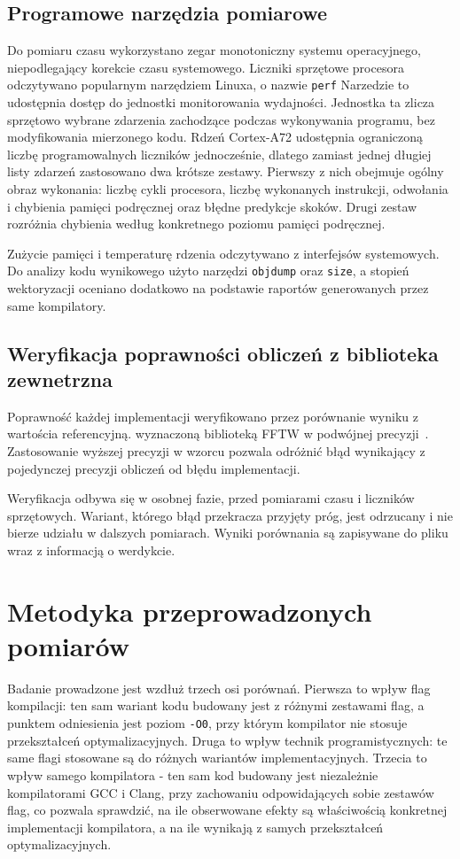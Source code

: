 \subsection{Programowe narzędzia pomiarowe}

Do pomiaru czasu wykorzystano zegar monotoniczny systemu operacyjnego,
niepodlegający korekcie czasu systemowego. Liczniki sprzętowe procesora
odczytywano popularnym narzędziem Linuxa, o nazwie \texttt{perf}
Narzedzie to udostępnia dostęp do jednostki monitorowania
wydajności. Jednostka ta zlicza sprzętowo
wybrane zdarzenia zachodzące podczas wykonywania programu, bez modyfikowania
mierzonego kodu.
Rdzeń Cortex-A72 udostępnia ograniczoną liczbę programowalnych liczników
jednocześnie, dlatego zamiast jednej długiej listy zdarzeń zastosowano dwa
krótsze zestawy.
Pierwszy z nich obejmuje ogólny obraz wykonania: liczbę cykli procesora,
liczbę wykonanych instrukcji, odwołania i chybienia pamięci podręcznej oraz
błędne predykcje skoków. Drugi zestaw rozróżnia chybienia według konkretnego
poziomu pamięci podręcznej.

Zużycie pamięci i temperaturę rdzenia odczytywano z interfejsów systemowych. Do analizy kodu wynikowego
użyto narzędzi \texttt{objdump} oraz \texttt{size}, a stopień wektoryzacji
oceniano dodatkowo na podstawie raportów generowanych przez same kompilatory.

\subsection{Weryfikacja poprawności obliczeń z biblioteka zewnetrzna}  
Poprawność każdej implementacji  weryfikowano przez porównanie wyniku
z wartościa referencyjną. wyznaczoną biblioteką FFTW w podwójnej
precyzji~\cite{FFTWPaper}. Zastosowanie wyższej precyzji w wzorcu pozwala
odróżnić błąd wynikający z pojedynczej precyzji obliczeń od błędu
implementacji.

Weryfikacja odbywa się w osobnej fazie, przed pomiarami czasu i liczników
sprzętowych. Wariant, którego błąd przekracza przyjęty próg, jest odrzucany
i nie bierze udziału w dalszych pomiarach. Wyniki porównania są
zapisywane do pliku wraz z informacją o werdykcie.
\section{Metodyka przeprowadzonych pomiarów}\label{sec:metodykaBadan}
Badanie prowadzone jest wzdłuż trzech osi porównań. Pierwsza to wpływ flag
kompilacji: ten sam wariant kodu budowany jest z różnymi zestawami flag,
a punktem odniesienia jest poziom \texttt{-O0}, przy którym kompilator nie
stosuje przekształceń optymalizacyjnych. Druga to wpływ technik
programistycznych: te same flagi stosowane są do różnych wariantów
implementacyjnych. Trzecia to wpływ samego kompilatora - ten sam kod
budowany jest niezależnie kompilatorami GCC i Clang, przy zachowaniu
odpowidających sobie zestawów flag, co pozwala sprawdzić, na ile obserwowane efekty
są właściwością konkretnej implementacji kompilatora, a na ile wynikają
z samych przekształceń optymalizacyjnych.

